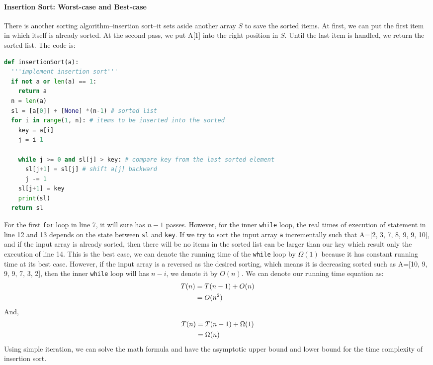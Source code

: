 \documentclass[../main.tex]{subfiles}
\begin{document}
\paragraph{Insertion Sort: Worst-case and Best-case} There is another sorting algorithm--insertion sort--it sets aside another array $S$ to save the sorted items. At first, we can put the first item in which itself is already sorted. At the second pass, we put A[1] into the right position in $S$. Until the last item is handled, we return the sorted list. The code is:
\begin{lstlisting}[language=Python]
def insertionSort(a):
  '''implement insertion sort'''
  if not a or len(a) == 1:
    return a
  n = len(a)
  sl = [a[0]] + [None] *(n-1) # sorted list
  for i in range(1, n): # items to be inserted into the sorted
    key = a[i]
    j = i-1 

    while j >= 0 and sl[j] > key: # compare key from the last sorted element
      sl[j+1] = sl[j] # shift a[j] backward
      j -= 1
    sl[j+1] = key
    print(sl)
  return sl
\end{lstlisting}
For the first \texttt{for} loop in line 7, it will sure has $n-1$ passes. However, for the inner \texttt{while} loop, the real times of execution of statement in line 12 and 13 depends on the state between \texttt{sl} and \texttt{key}. If we try to sort the input array \texttt{a} incrementally such that A=[2, 3, 7, 8, 9, 9, 10], and if the input array is already sorted, then there will be no items in the sorted list can be larger than our key which result only the execution of line 14. This is the best case, we can denote the running time of the \texttt{while} loop by $\Omega(1)$ because it has constant running time at its best case. However, if the input array is a reversed as the desired sorting, which means it is decreasing sorted such as A=[10, 9, 9, 9, 7, 3, 2], then the inner \texttt{while} loop will has $n-i$, we denote it by $O(n)$. We can denote our running time equation as:
\begin{align}
    T(n)&=T(n-1)+O(n)\\
    &=O(n^2) \notag
\end{align}
And, 
\begin{align}
    T(n)&=T(n-1)+\Omega(1)\\
    &=\Omega(n)\notag
\end{align}
Using simple iteration, we can solve the math formula and have the asymptotic upper bound and lower bound for the time complexity of insertion sort. 
\end{document}
